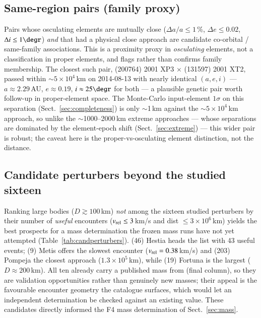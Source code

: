 \documentclass{aa}
\begin{document}
\subsection{Same-region pairs (family proxy)}
\label{sec:family}

Pairs whose osculating elements are mutually close ($\Delta a/a\leq1$\,\%,
$\Delta e\leq0.02$, $\Delta i\leq1\degr$) \emph{and} that had a physical close
approach are candidate co-orbital / same-family associations. This is a
proximity proxy in \emph{osculating} elements, not a classification in proper
elements, and flags rather than confirms family membership. The closest such
pair, (200764) 2001 XP3 $\times$ (131597) 2001 XT2, passed within
$\sim$$5\times10^4$\,km on 2014-08-13 with nearly identical $(a, e, i)$ ---
$a\approx2.29$\,AU, $e\approx0.19$, $i\approx25\degr$ for both --- a plausible
genetic pair worth follow-up in proper-element space. The Monte-Carlo
input-element $1\sigma$ on this separation (Sect.~\ref{sec:completeness}) is only
$\sim$1\,km against the $\sim$$5\times10^4$\,km approach, so unlike the
$\sim$1000--2000\,km extreme approaches --- whose separations are dominated by the
element-epoch shift (Sect.~\ref{sec:extreme}) --- this wider pair is robust; the
caveat here is the proper-vs-osculating element distinction, not the distance.

\subsection{Candidate perturbers beyond the studied sixteen}
\label{sec:candperturbers}

Ranking large bodies ($D\gtrsim100$\,km) \emph{not} among the sixteen studied
perturbers by their number of \emph{useful} encounters ($v_{\rm rel}\leq3$\,km/s
and dist $\leq3\times10^6$\,km) yields the best prospects for a mass
determination the frozen mass runs have not yet attempted
(Table~\ref{tab:candperturbers}). (46) Hestia heads the list with 43 useful
events; (9) Metis offers the slowest encounter ($v_{\rm rel} = 0.38$\,km/s) and
(203) Pompeja the closest approach ($1.3\times10^5$\,km), while (19) Fortuna is
the largest ($D\approx200$\,km). All ten already
carry a published mass from \citet{fuentesmunoz2025} (final column), so they are
validation opportunities rather than genuinely new masses; their appeal is the
favourable encounter geometry the catalogue surfaces, which would let an
independent determination be checked against an existing value. These candidates
directly informed the F4 mass determination of Sect.~\ref{sec:mass}.
\end{document}
